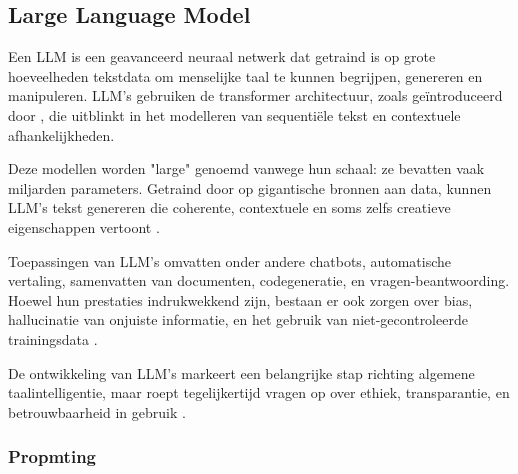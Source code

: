     \subsection{Large Language Model}
    
        
     Een LLM is een geavanceerd neuraal netwerk dat getraind is op grote hoeveelheden tekstdata om menselijke taal te kunnen begrijpen, genereren en manipuleren. LLM's gebruiken de transformer architectuur, zoals geïntroduceerd door \textcite{vaswani2023attentionneed}, die uitblinkt in het modelleren van sequentiële tekst en contextuele afhankelijkheden.
      
     Deze modellen worden "large" genoemd vanwege hun schaal: ze bevatten vaak miljarden parameters. Getraind door op gigantische bronnen aan data, kunnen LLM's tekst genereren die coherente, contextuele en soms zelfs creatieve eigenschappen vertoont \autocite{Gupta2025}.
      
     Toepassingen van LLM's omvatten onder andere chatbots, automatische vertaling, samenvatten van documenten, codegeneratie, en vragen-beantwoording. Hoewel hun prestaties indrukwekkend zijn, bestaan er ook zorgen over bias, hallucinatie van onjuiste informatie, en het gebruik van niet-gecontroleerde trainingsdata \autocite{Gupta2025}.
     
     De ontwikkeling van LLM’s markeert een belangrijke stap richting algemene taalintelligentie, maar roept tegelijkertijd vragen op over ethiek, transparantie, en betrouwbaarheid in gebruik \autocite{Gupta2025}.
     
     
     \subsubsection{Propmting} 
     
     
